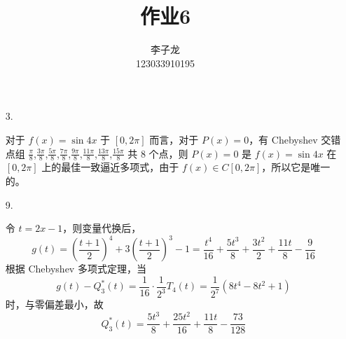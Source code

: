 \documentclass{sjtuarticle}
\title{作业6}
\author{李子龙\\123033910195}
\begin{document}
\maketitle


\begin{itemize}
    \item[3.] \begin{solution}
        对于 $f(x)=\sin 4x$ 于 $[0,2\pi]$ 而言，对于 $P(x)=0$，有 Chebyshev 交错点组 $\frac{\pi}{8}$,$\frac{3\pi}{8}$,$\frac{5\pi}{8}$,$\frac{7\pi}{8}$,$\frac{9\pi}{8}$,$\frac{11\pi}{8}$,$\frac{13\pi}{8}$,$\frac{15\pi}{8}$ 共 8 个点，则 $P(x)=0$ 是 $f(x)=\sin 4x$ 在 $[0,2\pi]$ 上的最佳一致逼近多项式，由于 $f(x)\in C[0,2\pi]$，所以它是唯一的。
        
    \end{solution}
    \item[9.] \begin{solution}
        令 $t=2x-1$，则变量代换后，
        \begin{equation*}
            g(t)=\left(\frac{t+1}{2}\right)^4+3\left(\frac{t+1}{2}\right)^3-1=\frac{t^{4}}{16} + \frac{5 t^{3}}{8} + \frac{3 t^{2}}{2} + \frac{11 t}{8} - \frac{9}{16}
        \end{equation*}
        根据 Chebyshev 多项式定理，当
        \begin{equation*}
            g(t)-Q^*_3(t)=\frac{1}{16}\cdot\frac{1}{2^3}T_4(t)=\frac{1}{2^7}(8t^4-8t^2+1)
        \end{equation*}
        时，与零偏差最小，故
        \begin{equation*}
            Q^*_3(t)=\frac{5 t^{3}}{8} + \frac{25 t^{2}}{16} + \frac{11 t}{8} - \frac{73}{128}

\end{equation*}
\end{solution}
\end{itemize}
\end{document}
